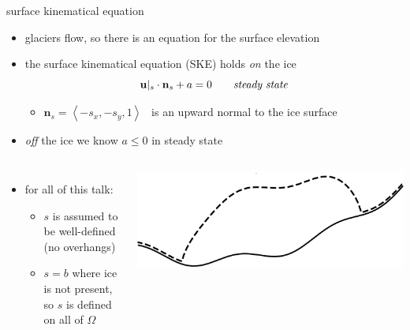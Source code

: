 \documentclass[usepdftitle=false]{beamer}
\newcommand{\bn}{\mathbf{n}}
\newcommand{\bu}{\mathbf{u}}
\begin{document}
\begin{frame}{surface kinematical equation}

\begin{itemize}
\item glaciers flow, so there is an equation for the surface elevation
\item the surface kinematical equation (SKE) holds \emph{on} the ice
    $$\bu|_s \cdot \bn_s + a=0 \qquad \text{\emph{steady state}}$$

    \begin{itemize}
    \item $\bn_s = \left<-s_x,-s_y,1\right>$  \, is an upward normal to the ice surface
    \end{itemize}
\item \emph{off} the ice we know $a\le 0$ in steady state
\end{itemize}

\bigskip
\begin{columns}
        \begin{itemize}
        \item for all of this talk:
            \begin{itemize}
            \item $s$ is assumed to be well-defined (no overhangs)
            \item $s=b$ where ice is not present, so $s$ is defined on all of $\Omega$
            \end{itemize}
        \end{itemize}
        \includegraphics[width=1.05\textwidth]{figs/simpledomain.png}
\end{columns}
\end{frame}
\end{document}
